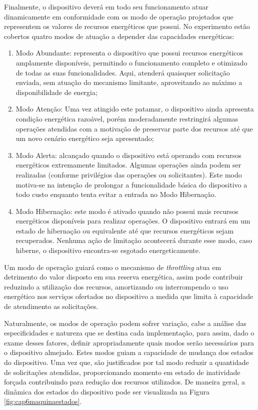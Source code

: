 Finalmente, o dispositivo deverá em todo seu funcionamento atuar dinamicamente em conformidade com os modo de operação projetados que representem os valores de recursos energéticos que possui. No experimento estão cobertos quatro modos de atuação a depender das capacidades energéticas:

\begin{enumerate}	
\item Modo Abundante:  representa o dispositivo que possui recursos energéticos amplamente disponíveis, permitindo o funcionamento completo e otimizado de todas as suas funcionalidades. Aqui, atenderá quaisquer solicitação enviada, sem atuação do mecanismo limitante, aproveitando ao máximo a disponibilidade de energia;
\item Modo Atenção: Uma vez atingido este patamar, o dispositivo ainda apresenta condição energética razoável, porém moderadamente restringirá algumas operações atendidas com a motivação de preservar parte dos recursos até que um novo cenário energético seja apresentado;
\item Modo Alerta: alcançado quando o dispositivo está operando com recursos energéticos extremamente limitados. Algumas operações ainda podem ser realizadas (conforme privilégios das operações ou solicitantes). Este modo motiva-se na intenção de prolongar a funcionalidade básica do dispositivo a todo custo enquanto tenta evitar a entrada no Modo Hibernação. 
\item Modo Hibernação: este modo é ativado quando não possui mais recursos energéticos disponíveis para realizar operações. O dispositivo entrará em um estado de hibernação ou equivalente até que recursos energéticos sejam recuperados. Nenhuma ação de limitação acontecerá durante esse modo, caso hiberne,  o dispositivo encontra-se esgotado energeticamente.
\end{enumerate}

Um modo de operação guiará como o mecanismo de \textit{throttling} atua em detrimento do valor disposto em sua reserva energética, assim pode contribuir reduzindo a utilização dos recursos, amortizando ou interrompendo o uso energético nos serviços ofertados no dispositivo a medida que limita à capacidade de atendimento as solicitações. 

Naturalmente, os modos de operação podem sofrer variação, cabe a análise das especificidades e natureza que se destina cada implementação, para assim, dado o exame desses fatores, definir apropriadamente quais modos serão necessários para o dispositivo almejado. Estes modos guiam a capacidade de mudança dos estados do dispositivo. Uma vez que, são justificados por tal modo  reduzir a quantidade de solicitações atendidas, proporcionando momento em estado de inatividade forçada contribuindo para redução dos recursos utilizados. De maneira geral, a dinâmica dos estados do dispositivo pode ser visualizada na Figura \ref{fig:cap6maquinaestados}. 

